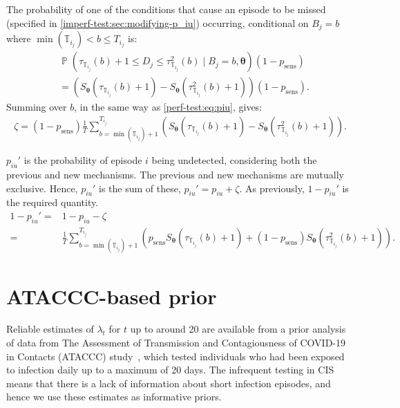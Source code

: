 \documentclass[12pt]{article}
\DeclareMathOperator{\prob}{\mathbb{P}}
\renewcommand{\vec}[1]{\bm{#1}}
\newcommand{\psens}{p_\text{sens}}
\newcommand{\sched}{\mathbb{T}}
\begin{document}
The probability of one of the conditions that cause an episode to be missed (specified in \cref{imperf-test:sec:modifying-p_iu}) occurring, conditional on $B_j = b$ where $\min(\sched_{i_j}) < b \leq T_{i_j}$ is:
\begin{align}
&\prob \left(
    \tau_{\sched_{i_j}}(b) + 1 \leq D_j \leq \tau^2_{\sched_{i_j}}(b)
    \mid B_j = b, \vec{\theta} \right) (1 - \psens) \\
&= \left( S_{\vec{\theta}}(\tau_{\sched_{i_j}}(b) + 1) - S_{\vec{\theta}}(\tau^2_{\sched_{i_j}}(b) + 1) \right) (1 - \psens).
\end{align}
Summing over $b$, in the same way as \cref{perf-test:eq:piu}, gives:
\begin{align}
\zeta = (1 - p_\text{sens})\frac{1}{T} \sum_{b=\min(\sched_{i_j}) + 1}^{T_{i_j}} \left( S_{\vec{\theta}}(\tau_{\sched_{i_j}}(b) + 1) - S_{\vec{\theta}}(\tau^2_{\sched_{i_j}}(b) + 1) \right).
\label{imperf-test:eq:zeta}
\end{align}

$p_{iu}'$ is the probability of episode $i$ being undetected, considering both the previous and new mechanisms.
The previous and new mechanisms are mutually exclusive.
Hence, $p_{iu}'$ is the sum of these, $p_{iu}' = p_{iu} + \zeta$.
As previously, $1 - p_{iu}'$ is the required quantity.
\begin{align}
1 - p_{iu}'
=& 1 - p_{iu} - \zeta \\
=& \frac{1}{T} \sum_{b=\min(\sched_{i_j}) + 1}^{T_{i_j}} \left( p_\text{sens} S_{\vec{\theta}}(\tau_{\sched_{i_j}}(b) + 1) + (1 - p_\text{sens}) S_{\vec{\theta}}(\tau^2_{\sched_{i_j}}(b) + 1)\right).
\end{align}

\section{ATACCC-based prior} \label{sec:ataccc-prior}

Reliable estimates of $\lambda_t$ for $t$ up to around 20 are available from a prior analysis of data from The Assessment of Transmission and Contagiousness of COVID-19 in Contacts (ATACCC) study~\citep{hakkiOnset}, which tested individuals who had been exposed to infection daily up to a maximum of 20 days.
The infrequent testing in CIS means that there is a lack of information about short infection episodes, and hence we use these estimates as informative priors.
\end{document}
